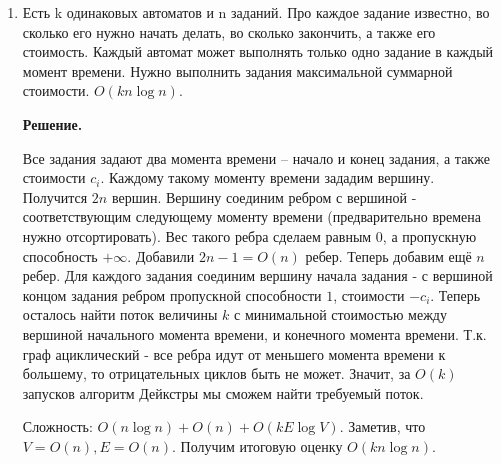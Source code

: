 \begin{enumerate}
	\item Есть k одинаковых автоматов и n заданий. Про каждое задание известно, во сколько его нужно начать делать, 
	во сколько закончить, а также его стоимость. Каждый автомат может выполнять только одно задание в каждый момент 
	времени. Нужно выполнить задания максимальной суммарной стоимости. $O(kn \log n)$.
	
	\textbf{Решение.}
	
	Все задания задают два момента времени -- начало и конец задания, а также стоимости $c_i$. Каждому такому 
	моменту времени зададим вершину. Получится $2n$ вершин. Вершину соединим ребром с вершиной - соответствующим 
	следующему моменту времени (предварительно времена нужно отсортировать). Вес такого ребра сделаем равным $0$, 
	а пропускную способность $+\infty$. Добавили $2n - 1 = O(n)$ ребер. Теперь добавим ещё $n$ ребер. Для каждого 
	задания соединим вершину начала задания - с вершиной концом задания ребром пропускной способности $1$, 
	стоимости $-c_i$. Теперь осталось найти поток величины $k$ с минимальной стоимостью между вершиной начального 
	момента времени, и конечного момента времени. Т.к. граф ациклический - все ребра идут от меньшего момента 
	времени к большему, то отрицательных циклов быть не может. Значит, за $O(k)$ запусков алгоритм Дейкстры мы 
	сможем найти требуемый поток. 
	
	Сложность: $O(n\log n) + O(n) + O(kE\log V)$. Заметив, что $V = O(n), E = O(n)$. Получим итоговую оценку $O(kn\log n)$.
	
\end{enumerate}
